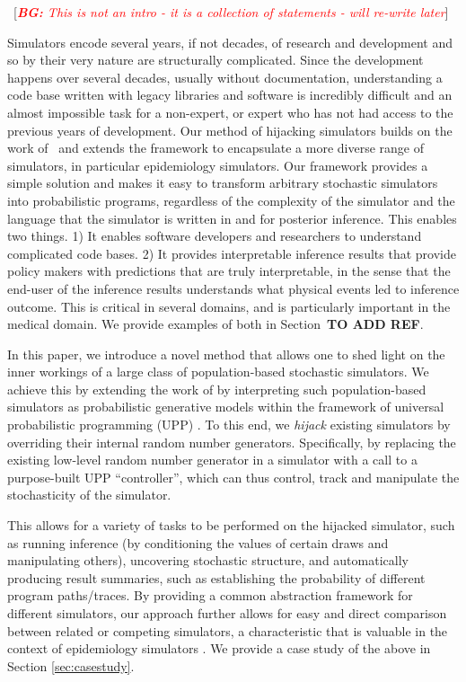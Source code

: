\documentclass{article}
\newcommand{\bg}[1]{~{{[{\it \textcolor{red}{{\bf BG:} #1}}]}}}
\begin{document}
\bg{This is not an intro - it is a collection of statements - will re-write later}


Simulators encode several years, if not decades, of research and development and so by their very nature are structurally complicated. Since the development happens over several decades, usually without documentation, understanding a code base written with legacy libraries and software is incredibly difficult and an almost impossible task for a non-expert, or expert who has not had access to the previous years of development. 
Our method of hijacking simulators builds on the work of~\cite{baydin2018efficient} and extends the framework to encapsulate a more diverse range of simulators, in particular epidemiology simulators. Our framework provides a simple solution and makes it easy to transform arbitrary stochastic simulators into probabilistic programs, regardless of the complexity of the simulator and the language that the simulator is written in and for posterior inference. This enables two things. 1) It enables software developers and researchers to understand complicated code bases. 2) It provides interpretable inference results that provide policy makers with predictions that are truly interpretable, in the sense that the end-user of the inference results understands what physical events led to inference outcome. This is critical in several domains, and is particularly important in the medical domain. We provide examples of both in Section~\textbf{TO ADD REF}.


In this paper, we introduce a novel method that allows one to shed light on the inner workings of a large class of population-based stochastic simulators. We achieve this by extending the work of \citep{baydin2018efficient} by interpreting such population-based simulators as probabilistic generative models within the framework of universal probabilistic programming (UPP) \cite{le-2016-inference}. To this end, we \emph{hijack} existing simulators by overriding their internal random number generators.  Specifically, by replacing the existing low-level random number generator in a simulator with a call to a purpose-built UPP ``controller'', which can thus control, track and manipulate the stochasticity of the simulator.

This allows for a variety of tasks to be performed on
the hijacked simulator, such as running inference (by conditioning
the values of certain draws and manipulating others),
uncovering stochastic structure, and automatically
producing result summaries, such as establishing the probability
of different program paths/traces.  By providing a common abstraction 
framework for different simulators, our approach further allows for
easy and direct comparison between related or competing
simulators, a characteristic that is valuable in the context of
epidemiology simulators \cite{ferris_openmalaria_2015}. We provide a case study of the above in Section \ref{sec:casestudy}.
\end{document}
